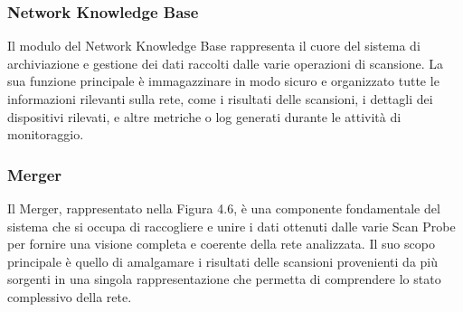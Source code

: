 \documentclass[target=bach,aauheader=,style=]{thud}
\begin{document}
\FloatBarrier


\subsubsection{Network Knowledge Base} 
Il modulo del Network Knowledge Base rappresenta il cuore del sistema di archiviazione e gestione dei dati raccolti dalle varie operazioni di scansione. La sua funzione principale è immagazzinare in modo sicuro e organizzato tutte le informazioni rilevanti sulla rete, come i risultati delle scansioni, i dettagli dei dispositivi rilevati, e altre metriche o log generati durante le attività di monitoraggio.

\FloatBarrier

\subsubsection{Merger}
Il Merger, rappresentato nella Figura 4.6, è una componente fondamentale del sistema che si occupa di raccogliere e unire i dati ottenuti dalle varie Scan Probe per fornire una visione completa e coerente della rete analizzata. Il suo scopo principale è quello di amalgamare i risultati delle scansioni provenienti da più sorgenti in una singola rappresentazione che permetta di comprendere lo stato complessivo della rete.
\end{document}
